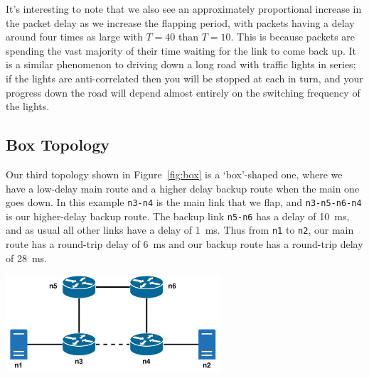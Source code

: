 \documentclass[withindex,glossary,openany]{cam-thesis}
\begin{document}
It's interesting to note that we also see an approximately proportional increase in the packet delay as we increase the flapping period, with packets having a delay around four times as large with $T=40$ than $T=10$. This is because packets are spending the vast majority of their time waiting for the link to come back up. It is a similar phenomenon to driving down a long road with traffic lights in series; if the lights are anti-correlated then you will be stopped at each in turn, and your progress down the road will depend almost entirely on the switching frequency of the lights.


\subsection{Box Topology}

Our third topology shown in Figure~\ref{fig:box} is a `box'-shaped one, where we have a low-delay main route and a higher delay backup route when the main one goes down. In this example \texttt{n3-n4} is the main link that we flap, and \texttt{n3-n5-n6-n4} is our higher-delay backup route. The backup link \texttt{n5-n6} has a delay of \SI{10}{\ms}, and as usual all other links have a delay of \SI{1}{\ms}. Thus from \texttt{n1} to \texttt{n2}, our main route has a round-trip delay of \SI{6}{\ms} and our backup route has a round-trip delay of \SI{28}{\ms}.

\begin{minipage}{1\textwidth} \centering
	\includegraphics[width=0.6\textwidth]{delay_box_topology}
\end{minipage}
\end{document}
